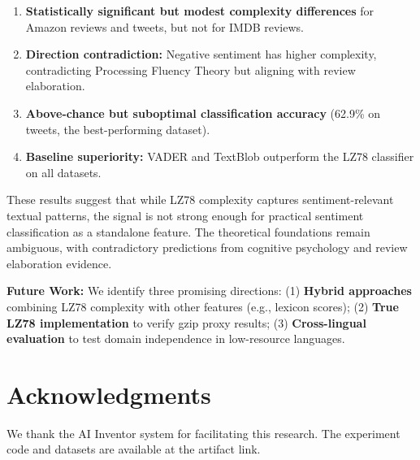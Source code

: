 \documentclass[11pt,letterpaper]{article}
\begin{document}
\begin{enumerate}
  \item \textbf{Statistically significant but modest complexity differences} for Amazon reviews and tweets, but not for IMDB reviews.

  \item \textbf{Direction contradiction:} Negative sentiment has higher complexity, contradicting Processing Fluency Theory but aligning with review elaboration.

  \item \textbf{Above-chance but suboptimal classification accuracy} (62.9\% on tweets, the best-performing dataset).

  \item \textbf{Baseline superiority:} VADER and TextBlob outperform the LZ78 classifier on all datasets.
\end{enumerate}

These results suggest that while LZ78 complexity captures sentiment-relevant textual patterns, the signal is not strong enough for practical sentiment classification as a standalone feature. The theoretical foundations remain ambiguous, with contradictory predictions from cognitive psychology and review elaboration evidence.

\textbf{Future Work:} We identify three promising directions: (1) \textbf{Hybrid approaches} combining LZ78 complexity with other features (e.g., lexicon scores); (2) \textbf{True LZ78 implementation} to verify gzip proxy results; (3) \textbf{Cross-lingual evaluation} to test domain independence in low-resource languages.

\section*{Acknowledgments}

We thank the AI Inventor system for facilitating this research. The experiment code and datasets are available at the artifact link.



\end{document}
